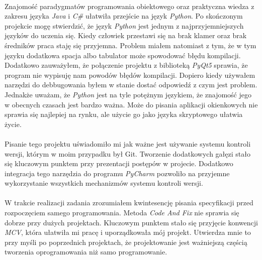 \documentclass[a4paper]{article}
\begin{document}
\paragraph{}
Znajomość paradygmatów programowania obiektowego oraz praktyczna wiedza z zakresu języka \textit{Java} i \textit{C\#} ułatwiła przejście na język \textit{Python}. Po skończonym projekcie mogę stwierdzić, że język \textit{Python} jest jednym z najprzyjemniejszych języków do uczenia się. Kiedy człowiek przestawi się na brak klamer oraz brak średników praca staję się przyjemna. Problem miałem natomiast z tym, że w tym języku dodatkowa spacja albo tabulator może spowodować błędu kompilacji. Dodatkowo zauważyłem, że połączenie projektu z biblioteką \textit{PyQt5} sprawia, że program nie wypisuję nam powodów błędów kompilacji. Dopiero kiedy używałem narzędzi do debbugowania byłem w stanie dostać odpowiedź z czym jest problem.\\
Jednakże uważam, że \textit{Python} jest na tyle potężnym językiem, że znajomość jego w obecnych czasach jest bardzo ważna. Może do pisania aplikacji okienkowych nie sprawia się najlepiej na rynku, ale użycie go jako języka skryptowego ułatwia życie.
\paragraph{}
Pisanie tego projektu uświadomiło mi jak ważne jest używanie systemu kontroli wersji, którym w moim przypadku był Git. Tworzenie dodatkowych gałęzi stało się kluczowym punktem przy prezentacji postępów w projecie. Dodatkowo integracja tego narzędzia do programu \textit{PyCharm} pozwoliło na przyjemne wykorzystanie wszystkich mechanizmów systemu kontroli wersji.
\paragraph{}
W trakcie realizacji zadania zrozumiałem kwintesencję pisania specyfikacji przed rozpoczęciem samego programowania. Metoda \textit{Code And Fix} nie sprawia się dobrze przy dużych projektach. Kluczowym punktem stało się przyjęcie konwencji \textit{MCV}, która ułatwiła mi pracę i uporządkowała mój projekt. Utwierdza mnie to przy myśli po poprzednich projektach, że projektowanie jest ważniejszą częścią tworzenia oprogramowania niż samo programowanie.
\label{end}
\end{document}
